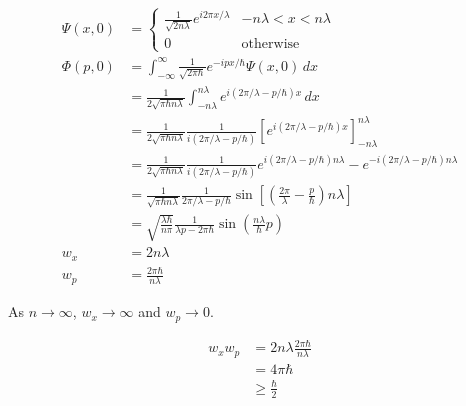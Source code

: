 \documentclass{article}
\begin{document}
\begin{align*}
  \Psi(x, 0) & = \begin{cases}
                   \frac{1}{\sqrt{2 n \lambda}} e^{i 2 \pi x / \lambda} & -n \lambda < x < n \lambda \\
                   0                                                    & \text{otherwise}
                 \end{cases}                                                                                         \\
  \Phi(p, 0) & = \int_{-\infty}^\infty \frac{1}{\sqrt{2 \pi \hbar}} e^{-i p x / \hbar} \Psi(x, 0) \,d x                                                                                          \\
             & = \frac{1}{2 \sqrt{\pi \hbar n \lambda}} \int_{-n \lambda}^{n \lambda} e^{i (2 \pi / \lambda - p / \hbar) x} \,d x                                                                \\
             & = \frac{1}{2 \sqrt{\pi \hbar n \lambda}} \frac{1}{i (2 \pi / \lambda - p / \hbar)} \left[ e^{i (2 \pi / \lambda - p / \hbar) x} \right]_{-n \lambda}^{n \lambda}                  \\
             & = \frac{1}{2 \sqrt{\pi \hbar n \lambda}} \frac{1}{i (2 \pi / \lambda - p / \hbar)} e^{i (2 \pi / \lambda - p / \hbar) n \lambda} - e^{-i (2 \pi / \lambda - p / \hbar) n \lambda} \\
             & = \frac{1}{\sqrt{\pi \hbar n \lambda}} \frac{1}{2 \pi / \lambda - p / \hbar} \sin \left[ \left( \frac{2 \pi}{\lambda} - \frac{p}{\hbar} \right) n \lambda \right]                 \\
             & = \sqrt{\frac{\lambda \hbar}{n \pi}} \frac{1}{\lambda p - 2 \pi \hbar} \sin \left( \frac{n \lambda}{\hbar} p \right)                                                              \\
  w_x        & = 2 n \lambda                                                                                                                                                                     \\
  w_p        & = \frac{2 \pi \hbar}{n \lambda}
\end{align*}

As $n \rightarrow \infty$, $w_x \rightarrow \infty$ and $w_p \rightarrow 0$.

\begin{align*}
  w_x w_p & = 2 n \lambda \frac{2 \pi \hbar}{n \lambda} \\
          & = 4 \pi \hbar                               \\
          & \ge \frac{\hbar}{2}
\end{align*}
\end{document}
